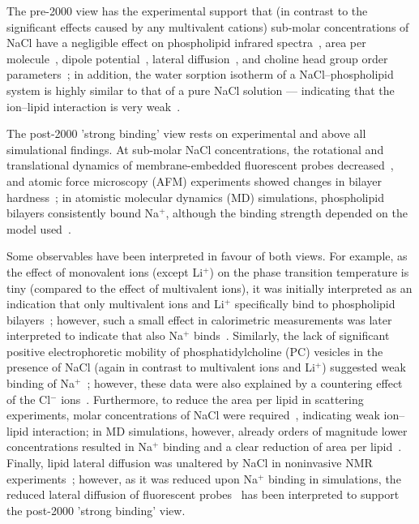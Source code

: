 The pre-2000 view has the experimental support that
(in contrast to the significant effects caused by any multivalent cations)
sub-molar concentrations of NaCl have a negligible effect on
phospholipid infrared spectra~\citep{binder02},
area per molecule~\citep{pabst07},
dipole potential~\citep{clarke99},
lateral diffusion~\citep{filippov09},
and choline head group order parameters~\citep{akutsu81};
in addition, the water sorption isotherm of a NaCl--phospholipid system
is highly similar to that of a  pure NaCl solution
--- indicating that the ion--lipid interaction is very weak~\citep{binder02}. 

The post-2000 'strong binding' view rests on experimental and above all simulational findings.
At sub-molar NaCl concentrations, the rotational and translational dynamics of membrane-embedded fluorescent probes decreased~\citep{bockmann03,vacha09a,harb13}, and atomic force microscopy (AFM) experiments showed changes in bilayer hardness~\citep{manyes05,manyes06,fukuma07,ferber11,morata12};
in atomistic molecular dynamics (MD) simulations, phospholipid bilayers consistently bound Na${^+}$,
although the binding strength depended on the model used~\citep{bockmann03,bockmann04,sachs04,berkowitz06,cordomi08,cordomi09,valley11,berkowitz12}.

Some observables have been interpreted in favour of both views. For example,
as the effect of monovalent ions (except Li$^+$)  on the phase transition temperature is tiny
(compared to the effect of multivalent ions), it was initially interpreted 
as an indication that only multivalent ions and Li$^+$ specifically bind to phospholipid bilayers~\citep{cevc90}; 
however, such a small effect in calorimetric measurements was later interpreted to indicate that also
Na$^+$ binds~\citep{bockmann03,klasczyk10}.
Similarly, the lack of significant positive electrophoretic mobility
of phosphatidylcholine (PC) vesicles in the presence of NaCl
(again in contrast to multivalent ions and Li$^+$)
suggested weak binding of Na$^+$~\citep{eisenberg79,tatulian87,manyes05,manyes06,klasczyk10};
however, these data were also explained by a countering effect of the Cl$^-$ ions~\citep{berkowitz06,knecht13}.
Furthermore, to reduce the area per lipid in scattering experiments, molar concentrations of NaCl were required~\citep{pabst07}, indicating weak ion--lipid interaction;
in MD simulations, however, already orders of magnitude lower concentrations resulted in Na$^+$ binding and a clear reduction of area per lipid~\citep{bockmann03,cordomi08}.
Finally, lipid lateral diffusion was unaltered by NaCl in noninvasive NMR experiments~\citep{filippov09};
however, as it was reduced upon Na$^+$ binding in simulations,
the reduced lateral diffusion of fluorescent probes~\citep{bockmann03,vacha09a,harb13}
has been interpreted to support the post-2000 'strong binding' view.

